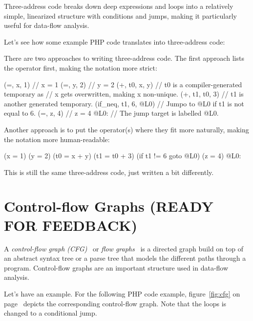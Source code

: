 Three-address code breaks down deep expressions and loops into a relatively simple, linearized structure with conditions and jumps, making it particularly useful for data-flow analysis.

Let's see how some example PHP code translates into three-address code:


There are two approaches to writing three-address code. The first approach lists the operator first, making the notation more strict:

\begin{textcode}
     (=, x, 1)            // x = 1
     (=, y, 2)            // y = 2
     (+, t0, x, y)        // t0 is a compiler-generated temporary as
                          // x gets overwritten, making x non-unique.
     (+, t1, t0, 3)       // t1 is another generated temporary.
     (if_neq, t1, 6, @L0) // Jumpo to @L0 if t1 is not equal to 6.
     (=, z, 4)            // z = 4
@L0:                      // The jump target is labelled @L0.
\end{textcode}

Another approach is to put the operator(s) where they fit more naturally, making the notation more human-readable:

\begin{textcode}
     (x = 1)
     (y = 2)
     (t0 = x + y)
     (t1 = t0 + 3)
     (if t1 != 6 goto @L0)
     (z = 4)
@L0:
\end{textcode}

This is still the same three-address code, just written a bit differently.



\section{Control-flow Graphs (READY FOR FEEDBACK)}
\label{cfg}

A \emph{control-flow graph (CFG)}~\cite{chess-west} or \emph{flow graphs}~\cite{compilers} is a directed graph build on top of an abstract syntax tree or a parse tree that models the different paths through a program. Control-flow graphs are an important structure used in data-flow analysis.

Let's have an example. For the following PHP code example, figure~\ref{fig:cfg} on page~\pageref{fig:cfg} depicts the corresponding control-flow graph. Note that the loops is changed to a conditional jump.

